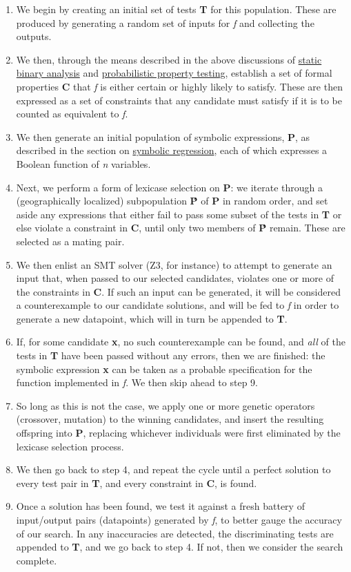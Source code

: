 \documentclass[11pt]{article}
\begin{document}
\begin{enumerate}
\item We begin by creating an initial set of tests \textbf{T} for this population. These are produced by generating a random set of inputs for \emph{f} and collecting the outputs.
\item We then, through the means described in the above discussions of \hyperref[sec:orgbbcfddc]{static binary analysis} and \hyperref[sec:orga03c90d]{probabilistic property testing}, establish a set of formal properties \textbf{C} that \emph{f} is either certain or highly likely to satisfy. These are then expressed as a set of constraints that any candidate must satisfy if it is to be counted as equivalent to \emph{f}.
\item We then generate an initial population of symbolic expressions, \textbf{P}, as described in the section on \hyperref[sec:orgceca113]{symbolic regression}, each of which expresses a Boolean function of \emph{n} variables.
\item Next, we perform a form of lexicase selection \cite{helmuth2015} on \textbf{P}: we iterate through a (geographically localized) subpopulation \textbf{Ṕ} of \textbf{P} in random order, and set aside any expressions that either fail to pass some subset of the tests in \textbf{T} or else violate a constraint in \textbf{C}, until only two members of \textbf{Ṕ} remain. These are selected as a mating pair.
\item We then enlist an SMT solver (Z3, for instance) to attempt to generate an input that, when passed to our selected candidates, violates one or more of the constraints in \textbf{C}. If such an input can be generated, it will be considered a counterexample to our candidate solutions, and will be fed to \emph{f} in order to generate a new datapoint, which will in turn be appended to \textbf{T}.
\item If, for some candidate \textbf{x}, no such counterexample can be found, and \emph{all} of the tests in \textbf{T} have been passed without any errors, then we are finished: the symbolic expression \textbf{x} can be taken as a probable specification for the function implemented in \emph{f}. We then skip ahead to step 9.
\item So long as this is not the case, we apply one or more genetic operators (crossover, mutation) to the winning candidates, and insert the resulting offspring into \textbf{P}, replacing whichever individuals were first eliminated by the lexicase selection process.
\item We then go back to step 4, and repeat the cycle until a perfect solution to every test pair in \textbf{T}, and every constraint in \textbf{C}, is found.
\item Once a solution has been found, we test it against a fresh battery of input/output pairs (datapoints) generated by \emph{f}, to better gauge the accuracy of our search. In any inaccuracies are detected, the discriminating tests are appended to \textbf{T}, and we go back to step 4. If not, then we consider the search complete.
\end{enumerate}
\end{document}
